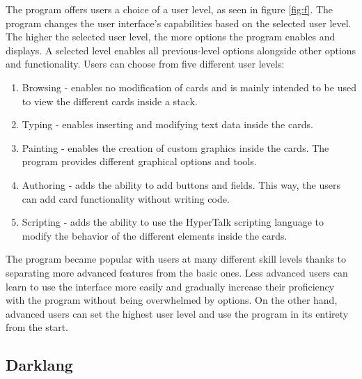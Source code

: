 The program offers users a choice of a user level, as seen in figure \ref{fig:f}. The program changes the user interface's capabilities based on the selected user level.
The higher the selected user level, the more options the program enables and displays. A selected level enables all previous-level options alongside other options and functionality.
Users can choose from five different user levels:
\begin{enumerate}
	\item Browsing - enables no modification of cards and is mainly intended to be used to view the different cards inside a stack.
	\item Typing - enables inserting and modifying text data inside the cards.
	\item Painting - enables the creation of custom graphics inside the cards. The program provides different graphical options and tools.
	\item Authoring - adds the ability to add buttons and fields. This way, the users can add card functionality without writing code.
	\item Scripting - adds the ability to use the HyperTalk scripting language to modify the behavior of the different elements inside the cards.
\end{enumerate}



The program became popular with users at many different skill levels thanks to separating more advanced features from the basic ones.
Less advanced users can learn to use the interface more easily and gradually increase their proficiency with the program without being overwhelmed by options.
On the other hand, advanced users can set the highest user level and use the program in its entirety from the start.


\subsection{Darklang}
\label{sec:darklang}

